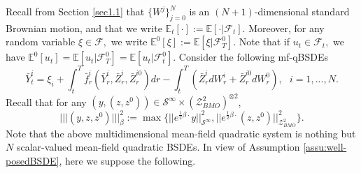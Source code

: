 \documentclass[10pt,a4paper]{article}
\newcommand{\E}{\mathbb{E}}
\newcommand{\MF}{{\mathcal{F}}}
\newcommand{\MZ}{{\mathcal{Z}}}
\newcommand{\MS}{{\mathcal{S}}}
\theoremstyle{plain}
\theoremstyle{definition}
\numberwithin{equation}{section}
\newcommand{\trinm}[1]{\vert\!\vert\!\vert #1 \vert\!\vert\!\vert}
\begin{document}
Recall from Section \ref{sec1.1} that $\{W^j\}_{j=0}^N$ is an $(N+1)$-dimensional standard Brownian motion, and that we write $\E_t[\cdot]:= \E[\cdot |\MF_t]$. Moreover, for any random variable $\xi \in \MF,$ we write $\E^0[\xi]:= \E[\xi| \MF_T^0]$. Note that if $u_t \in \MF_t,$ we have $\E^0[u_t]= \E[u_t| \MF_T^0]= \E[u_t | \MF_t^0].$ Consider the following mf-qBSDEs
\begin{equation}
\label{equ:gMF.1}
\bar{Y}_{t}^{i} = \xi_{i} + \int_{t}^{T}\bar{f}_{r}^{i}(\bar{Y}_{r}^{i},\bar{Z}_{r}^{i},\bar{Z}_{r}^{i0})dr - \int_{t}^{T}(\bar{Z}_{r}^{i}dW_{r}^{i} + \bar{Z}_{r}^{i0}dW_{r}^{0}), \ \  \ i=1,...,N.
\end{equation}
Recall that for any $(y,(z,z^0)) \in \MS^\infty \times (\MZ_{BMO}^2)^{ \otimes 2}$,
\[
\trinm{(y,z,z^{0})}_{\beta}^{2} := \max\big\{||e^{\tfrac{1}{2}\beta\cdot}y||_{\mathcal{S}^{\infty}}^{2},||e^{\tfrac{1}{2}\beta\cdot}(z,z^{0})||_{\mathcal{Z}_{BMO}^{2}}^{2}\big\}.
\]
Note that the above multidimensional mean-field quadratic system is nothing but $N$ scalar-valued mean-field quadratic BSDEs.
In view of Assumption \ref{assu:well-posedBSDE}, here we suppose the following.
\end{document}
